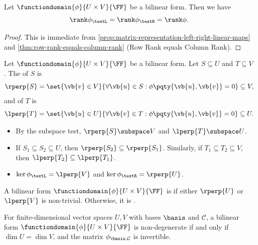 \begin{corollary}
    \label{cor:rank-of-left-and-right-linear-maps}%
    Let \(\functiondomain{\phi}{U \times V}{\FF}\) be a bilinear form. Then we have
    \[
        \rank \phi_{\textL} = \rank \phi_{\textR} = \rank \phi.
    \]
\end{corollary}

\begin{proof}
    This is immediate from \autoref{prop:matrix-representation-left-right-linear-maps} and \autoref{thm:row-rank-equals-column-rank} (Row Rank equals Column Rank).
\end{proof}

\begin{definition}
    Let \(\functiondomain{\phi}{U \times V}{\FF}\) be a bilinear form. Let \(S \subseteq U\) and \(T \subseteq V\). The  of \(S\) is
    \[
        \rperp{S} = \set{\vb{v} \in V}{\forall \vb{u} \in S: \phi\pqty{\vb{u}, \vb{v}} = 0} \subseteq V,
    \]
    and of \(T\) is
    \[
        \lperp{T} = \set{\vb{u} \in U}{\forall \vb{v} \in T: \phi\pqty{\vb{u}, \vb{v}} = 0} \subseteq U.
    \]
\end{definition}

\begin{remarks}
    \begin{itemize}
        \item By the subspace test, \(\rperp{S} \subspace V\) and \(\lperp{T} \subspace U\).
        \item If \(S_1 \subseteq S_2 \subseteq U\), then \(\rperp{S_2} \subseteq \rperp{S_1}\). Similarly, if \(T_1 \subseteq T_2 \subseteq V\), then \(\lperp{T_2} \subseteq \lperp{T_1}\).
        \item \(\ker \phi_{\textL} = \lperp{V}\) and \(\ker \phi_{\textR} = \rperp{U}\).
    \end{itemize}
\end{remarks}

\begin{definition}
    A bilinear form \(\functiondomain{\phi}{U \times V}{\FF}\) is  if either \(\rperp{U}\) or \(\lperp{V}\) is non-trivial. Otherwise, it is .
\end{definition}

\begin{proposition}
    For finite-dimensional vector spaces \(U, V\) with bases \(\basis\) and \(\mathcal{C}\), a bilinear form \(\functiondomain{\phi}{U \times V}{\FF}\) is non-degenerate if and only if \(\dim U = \dim V\), and the matrix \(\phi_{\basis, \mathcal{C}}\) is invertible.
\end{proposition}

